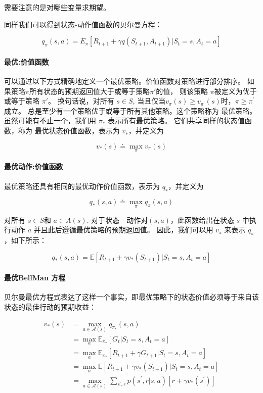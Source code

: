 \documentclass[UTF8,a4paper,12pt]{ctexbook}
\begin{document}
				需要注意的是对哪些变量求期望。
				
				同样我们可以得到状态-动作值函数的贝尔曼方程：
				
				\begin{equation}
					q_\pi(s,a) = E_\pi[R_{t+1} + \gamma q(S_{t+1},A_{t+1})|S_t = s, A_t = a]
				\end{equation}
				
				
			
			\paragraph{最优:价值函数}
				可以通过以下方式精确地定义一个最优策略。价值函数对策略进行部分排序。 如果策略$\pi$所有状态的预期返回值大于或等于策略$\pi'$的值， 则该策略 $\pi$被定义为优于或等于策略 $\pi'$。 换句话说，对所有 $s \in S$, 当且仅当$v_\pi(s)\ge v_{\pi^{^\prime}}(s)$时，$\pi\ge\pi^\prime$ 成立。 总是至少有一个策略优于或等于所有其他策略。这个策略称为 最优策略。 虽然可能有不止一个，我们用 $\pi_*$ 表示所有最优策略。 它们共享同样的状态值函数，称为 最优状态价值函数，表示为 $v_∗$，并定义为
			
				$$ v_*(s) \doteq \max_\pi v_\pi(s) $$
				
			\paragraph{最优动作:价值函数}
				最优策略还具有相同的最优动作价值函数，表示为 $q_∗$，并定义为
				
				$$q_*(s,a) \doteq \max_\pi q_\pi(s,a)$$
				
				对所有 $s \in S$和 $a \in A(s)$. 对于状态—动作对$(s,a)$，此函数给出在状态 $s$ 中执行动作 $a$ 并且此后遵循最优策略的预期返回值。 因此，我们可以用 $v_∗$ 来表示 $q_∗$ ，如下所示：
				
				$$q_*(s,a) = \mathbb{E}\left[R_{t+1}+\gamma v_* (S_{t+1})|S_t=s,A_t=a\right]$$
			
			
			\paragraph{最优BellMan 方程}
				贝尔曼最优方程式表达了这样一个事实，即最优策略下的状态价值必须等于来自该状态的最佳行动的预期收益：
			
				$$\begin{aligned}
				v_*(s) &= \max_{a\in\mathcal{A}(s)} q_{\pi_*}(s,a) \\
				&=\max_a \mathbb{E}_{\pi_*}[G_t|S_t=s,A_t=a] \\
				&=\max_a \mathbb{E}_{\pi_*}[R_{t+1}+\gamma G_{t+1}|S_t=s,A_t=a]  \\
				&=\max_a \mathbb{E}[R_{t+1}+\gamma v_*(S_{t+1})|S_t=s,A_t=a] \\
				&=\max_{a\in \mathcal{A}(s)}\sum_{s^\prime,r} p(s^\prime,r|s,a)[r+\gamma v_*(s^\prime)]
				\end{aligned}$$
						
\end{document}
